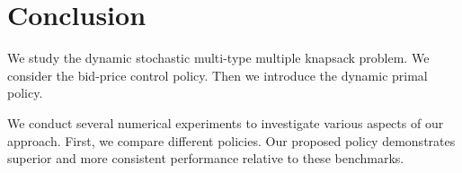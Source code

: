 \section{Conclusion}\label{sec_conclusion}
We study the dynamic stochastic multi-type multiple knapsack problem. We consider the bid-price control policy. Then we introduce the dynamic primal policy.

We conduct several numerical experiments to investigate various aspects of our approach. First, we compare different policies. Our proposed policy demonstrates superior and more consistent performance relative to these benchmarks.




